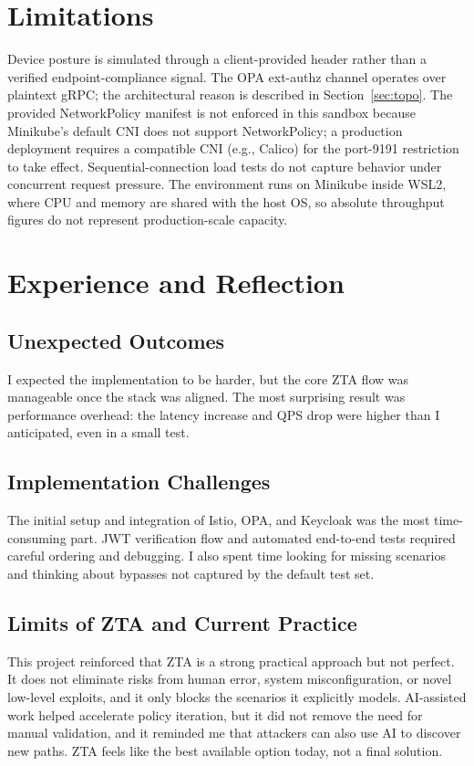 \documentclass[conference]{IEEEtran}
\begin{document}
\vspace{4pt}
\section{Limitations}
Device posture is simulated through a client-provided header rather than a verified
endpoint-compliance signal. The OPA ext-authz channel operates over plaintext gRPC; the architectural reason
is described in Section~\ref{sec:topo}. The provided NetworkPolicy manifest is not
enforced in this sandbox because Minikube's default CNI does not support NetworkPolicy;
a production deployment requires a compatible CNI (e.g., Calico) for the port-9191
restriction to take effect. Sequential-connection load tests do not capture behavior under
concurrent request pressure. The environment runs on Minikube inside WSL2, where CPU
and memory are shared with the host OS, so absolute throughput figures do not represent
production-scale capacity.

\vspace{4pt}
\section{Experience and Reflection}
\subsection{Unexpected Outcomes}
I expected the implementation to be harder, but the core ZTA flow was manageable once
the stack was aligned. The most surprising result was performance overhead: the
latency increase and QPS drop were higher than I anticipated, even in a small test.

\subsection{Implementation Challenges}
The initial setup and integration of Istio, OPA, and Keycloak was the most time-consuming part. JWT verification flow and automated end-to-end tests required careful
ordering and debugging. I also spent time looking for missing scenarios and thinking
about bypasses not captured by the default test set.

\subsection{Limits of ZTA and Current Practice}
This project reinforced that ZTA is a strong practical approach but not perfect. It
does not eliminate risks from human error, system misconfiguration, or novel low-level
exploits, and it only blocks the scenarios it explicitly models. AI-assisted work
helped accelerate policy iteration, but it did not remove the need for manual
validation, and it reminded me that attackers can also use AI to discover new paths.
ZTA feels like the best available option today, not a final solution.
\end{document}

